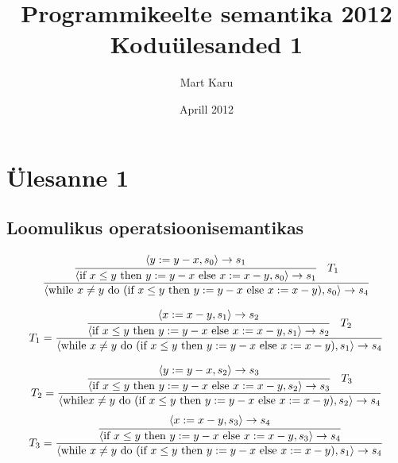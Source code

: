 \documentclass[a4paper,oneside]{article}
\begin{document}
\title{Programmikeelte semantika 2012\\
Koduülesanded 1}
\author{Mart Karu}
\date{Aprill 2012}
\maketitle
\section{Ülesanne 1}
\subsection{Loomulikus operatsioonisemantikas}

\[
  \frac{
    \cfrac{
      \langle y := y-x, s_0 \rangle \rightarrow s_1
    }{
      \langle
        \text{if } x \leq y
          \text{ then } y := y-x
          \text{ else } x := x-y
        , s_0
      \rangle \rightarrow s_1
    }
    \quad
    T_1
  }{
    \langle 
    \text{while } x \neq  y \text{ do }
      (\text{if } x \leq y
        \text{ then } y := y-x
        \text{ else } x := x-y)
      , s_0
    \rangle \rightarrow s_4
  }
\]

\[
  T_1 = \frac{
    \cfrac{
      \langle x := x-y, s_1 \rangle \rightarrow s_2
    }{
      \langle 
        \text{if } x \leq y
          \text{ then } y := y-x
          \text{ else } x:= x-y
        , s_1
      \rangle \rightarrow s_2
    }
    \quad
    T_2
  }{
    \langle 
    \text{while } x \neq y \text{ do }
      (\text{if } x \leq y
        \text{ then } y := y-x
        \text{ else } x:= x-y)
      , s_1
    \rangle \rightarrow s_4
  }
\]

\[
  T_2 = \frac{
    \cfrac{
      \langle y := y-x, s_2 \rangle \rightarrow s_3
    }{
      \langle 
        \text{if } x \leq y
          \text{ then } y := y-x
          \text{ else } x := x-y
        , s_2
      \rangle \rightarrow s_3
    }
    \quad
    T_3
  }{
    \langle 
    \text{while} x \neq  y \text{ do }
      (\text{if } x \leq y
        \text{ then } y := y-x
        \text{ else } x := x-y)
      , s_2
    \rangle \rightarrow s_4
  }
\]
\[
  T_3 = \frac{
    \cfrac{
      \langle x := x-y, s_3 \rangle \rightarrow s_4
    }{
      \langle
        \text{if } x \leq y
          \text{ then } y := y-x
          \text{ else } x := x-y
        , s_3
      \rangle \rightarrow s_4
    }
  }{
    \langle
    \text{while } x \neq y \text{ do }
      (\text{if } x \leq y
        \text{ then } y := y-x
        \text{ else } x := x-y )
      , s_1
    \rangle \rightarrow s_4
  }
\]
\end{document}
